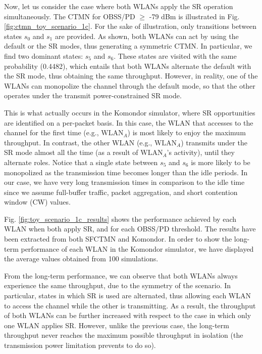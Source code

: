 \documentclass[comsoc]{IEEEtran}
\begin{document}
	Now, let us consider the case where both WLANs apply the SR operation simultaneously. The CTMN for OBSS/PD $\geq$ -79 dBm is illustrated in Fig. \ref{fig:ctmn_toy_scenario_1c}. For the sake of illustration, only transitions between states $s_0$ and $s_1$ are provided. As shown, both WLANs can act by using the default or the SR modes, thus generating a symmetric CTMN. In particular, we find two dominant states: $s_5$  and $s_6$. These states are visited with the same probability (0.4482), which entails that both WLANs alternate the default with the SR mode, thus obtaining the same throughput. However, in reality, one of the WLANs can monopolize the channel through the default mode, so that the other operates under the transmit power-constrained SR mode.
	
	This is what actually occurs in the Komondor simulator, where SR opportunities are identified on a per-packet basis. In this case, the WLAN that accesses to the channel for the first time (e.g., $\text{WLAN}_A$) is most likely to enjoy the maximum throughput. In contrast, the other WLAN (e.g., $\text{WLAN}_A$) transmits under the SR mode almost all the time (as a result of $\text{WLAN}_A$'s activity), until they alternate roles. Notice that a single state between $s_5$  and $s_6$ is more likely to be monopolized as the transmission time becomes longer than the idle periods. In our case, we have very long transmission times in comparison to the idle time since we assume full-buffer traffic, packet aggregation, and short contention window (CW) values.
	
	Fig. \ref{fig:toy_scenario_1c_results} shows the performance achieved by each WLAN when both apply SR, and for each OBSS/PD threshold. The results have been extracted from both SFCTMN and Komondor. In order to show the long-term performance of each WLAN in the Komondor simulator, we have displayed the average values obtained from 100 simulations.
	
	From the long-term performance, we can observe that both WLANs always experience the same throughput, due to the symmetry of the scenario. In particular, states in which SR is used are alternated, thus allowing each WLAN to access the channel while the other is transmitting. As a result, the throughput of both WLANs can be further increased with respect to the case in which only one WLAN applies SR. However, unlike the previous case, the long-term throughput never reaches the maximum possible throughput in isolation (the transmission power limitation prevents to do so).
	
\end{document}

